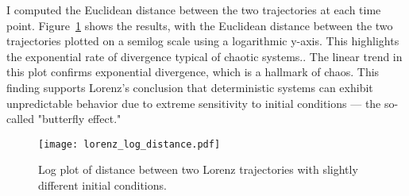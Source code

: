 \documentclass[12pt]{article}
\begin{document}
I computed the Euclidean distance between the two trajectories at each time point. Figure~\ref{fig:divergence} shows the results, with the Euclidean distance between the two trajectories plotted on a semilog scale using a logarithmic y-axis. This highlights the exponential rate of divergence typical of chaotic systems.. The linear trend in this plot confirms exponential divergence, which is a hallmark of chaos. This finding supports Lorenz’s conclusion that deterministic systems can exhibit unpredictable behavior due to extreme sensitivity to initial conditions — the so-called "butterfly effect."

\begin{figure}[H]
    \centering
    \texttt{[image: lorenz\_log\_distance.pdf]}
    \caption{Log plot of distance between two Lorenz trajectories with slightly different initial conditions.}
    \label{fig:divergence}
\end{figure}
\end{document}
